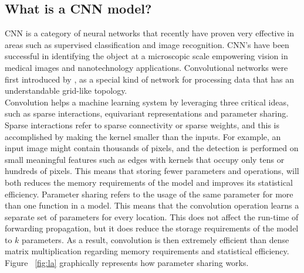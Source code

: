 \subsection{What is a CNN model?}
CNN is a category of neural networks that recently have proven very effective in areas such as supervised classification and image recognition. CNN's have been successful in identifying the object at a microscopic scale empowering vision in medical images and nanotechnology applications. Convolutional networks were first introduced by \cite{lecun1989generalization}, as a special kind of network for processing data that has an understandable grid-like topology.\\

Convolution helps a machine learning system by leveraging three critical ideas, such as sparse interactions, equivariant representations and parameter sharing. Sparse interactions refer to sparse connectivity or sparse weights, and this is accomplished by making the kernel smaller than the inputs. For example, an input image might contain thousands of pixels, and the detection is performed on small meaningful features such as edges with kernels that occupy only tens or hundreds of pixels. This means that storing fewer parameters and operations, will both reduces the memory requirements of the model and improves its statistical efficiency. Parameter sharing refers to the usage of the same parameter for more than one function in a model. This means that the convolution operation learns a separate set of parameters for every location. This does not affect the run-time of forwarding propagation, but it does reduce the storage requirements of the model to $k$ parameters. As a result, convolution is then extremely efficient than dense matrix multiplication regarding memory requirements and statistical efficiency. Figure ~\ref{fig:la} graphically represents how parameter sharing works.
